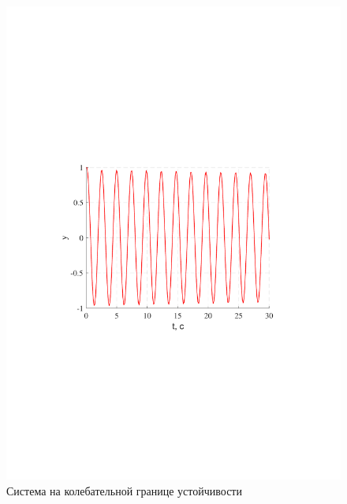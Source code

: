 \documentclass[a4paper,12pt]{article}
\begin{document}
				\begin{figure}[h!]
					\centering
					\includegraphics[width=6in]{KolebMOD.pdf}
					\caption{Система на колебательной границе устойчивости}
					\label{s_22}
				\end{figure}
						
\end{document}
